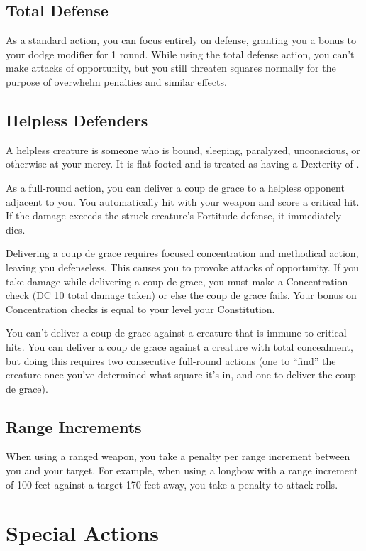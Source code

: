 \subsection{Total Defense}\label{Total Defense}
As a standard action, you can focus entirely on defense, granting you a  bonus to your dodge modifier for 1 round. While using the total defense action, you can't make attacks of opportunity, but you still threaten squares normally for the purpose of overwhelm penalties and similar effects.

\subsection{Helpless Defenders}
A helpless creature is someone who is bound, sleeping, paralyzed, unconscious, or otherwise at your mercy. It is flat-footed and is treated as having a Dexterity of .

\label{Coup de Grace} As a full-round action, you can deliver a coup de grace to a helpless opponent adjacent to you. You automatically hit with your weapon and score a critical hit. If the damage exceeds the struck creature's Fortitude defense, it immediately dies.

Delivering a coup de grace requires focused concentration and methodical action, leaving you defenseless. This causes you to provoke attacks of opportunity. If you take damage while delivering a coup de grace, you must make a Concentration check (DC 10 \add total damage taken) or else the coup de grace fails. Your bonus on Concentration checks is equal to your level \add your Constitution.

You can't deliver a coup de grace against a creature that is immune to critical hits. You can deliver a coup de grace against a creature with total concealment, but doing this requires two consecutive full-round actions (one to ``find'' the creature once you've determined what square it's in, and one to deliver the coup de grace).

\subsection{Range Increments}
When using a ranged weapon, you take a  penalty per range increment between you and your target. For example, when using a longbow with a range increment of 100 feet against a target 170 feet away, you take a  penalty to attack rolls.

\section{Special Actions}


